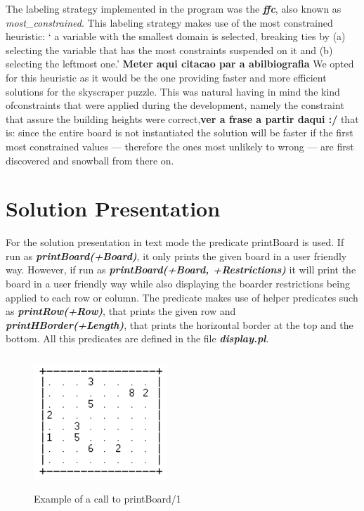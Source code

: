 \documentclass{llncs}
\begin{document}
The labeling strategy implemented in the program was the \textbf{\textit{ffc}}, also known as \textit{most\_constrained}. This labeling strategy makes use of the most constrained heuristic: ` a variable with the smallest domain is selected, breaking ties by (a) selecting the variable that has the most constraints suspended on it and (b) selecting the leftmost one.' \textbf{Meter aqui citacao par a abilbiografia} We opted for this heuristic as it would be the one providing faster and more efficient solutions for the skyscraper puzzle. This was natural having in mind the kind ofconstraints that were applied during the development, namely the constraint that assure the building heights were correct,\textbf{ver a frase a partir daqui :/} that is: since the entire board is not instantiated the solution will be faster if the first most constrained values --- therefore the ones most unlikely to wrong --- are first discovered and snowball from there on.

%
\section{Solution Presentation}

For the solution presentation in text mode the predicate printBoard is used. If run as \textbf{\textit{printBoard(+Board)}}, it only prints the given board in a user friendly way. However, if run as \textbf{\textit{printBoard(+Board, +Restrictions)}} it will print the board in a user friendly way while also displaying the boarder restrictions being applied to each row or column. The predicate makes use of helper predicates such as \textbf{\textit{printRow(+Row)}}, that prints the given row and \textbf{\textit{printHBorder(+Length)}}, that prints the horizontal border at the top and the bottom. All this predicates are defined in the file \textbf{\textit{display.pl}}.

\begin{figure}[h!]
\begin{center}
\includegraphics[height=5cm,width=5cm]{images/printBoard1.png}
\caption{Example of a call to printBoard/1}
\label{Figure 3}
\end{center}
\end{figure}
\end{document}
